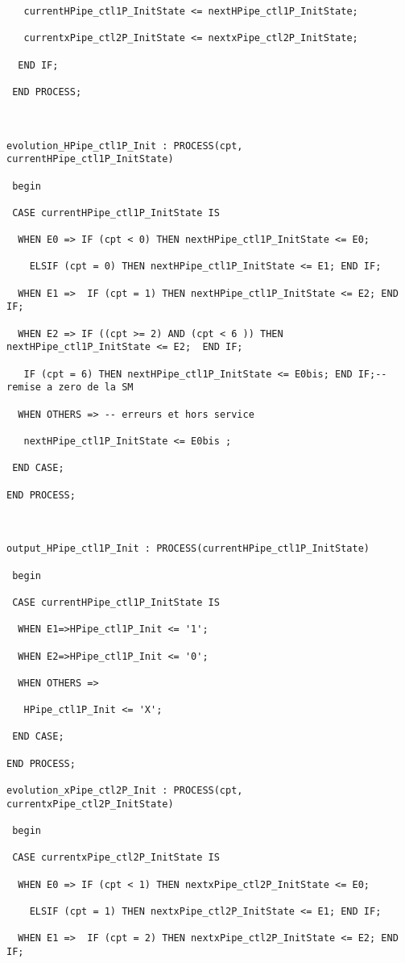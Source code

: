 \begin{verbatim}
   currentHPipe_ctl1P_InitState <= nextHPipe_ctl1P_InitState;

   currentxPipe_ctl2P_InitState <= nextxPipe_ctl2P_InitState;

  END IF;

 END PROCESS;



evolution_HPipe_ctl1P_Init : PROCESS(cpt, currentHPipe_ctl1P_InitState)

 begin 

 CASE currentHPipe_ctl1P_InitState IS

  WHEN E0 => IF (cpt < 0) THEN nextHPipe_ctl1P_InitState <= E0;

    ELSIF (cpt = 0) THEN nextHPipe_ctl1P_InitState <= E1; END IF;

  WHEN E1 =>  IF (cpt = 1) THEN nextHPipe_ctl1P_InitState <= E2; END IF;

  WHEN E2 => IF ((cpt >= 2) AND (cpt < 6 )) THEN nextHPipe_ctl1P_InitState <= E2;  END IF;

   IF (cpt = 6) THEN nextHPipe_ctl1P_InitState <= E0bis; END IF;-- remise a zero de la SM

  WHEN OTHERS => -- erreurs et hors service

   nextHPipe_ctl1P_InitState <= E0bis ;

 END CASE;

END PROCESS;



output_HPipe_ctl1P_Init : PROCESS(currentHPipe_ctl1P_InitState)

 begin

 CASE currentHPipe_ctl1P_InitState IS

  WHEN E1=>HPipe_ctl1P_Init <= '1'; 

  WHEN E2=>HPipe_ctl1P_Init <= '0'; 

  WHEN OTHERS =>

   HPipe_ctl1P_Init <= 'X';

 END CASE;

END PROCESS;

evolution_xPipe_ctl2P_Init : PROCESS(cpt, currentxPipe_ctl2P_InitState)

 begin 

 CASE currentxPipe_ctl2P_InitState IS

  WHEN E0 => IF (cpt < 1) THEN nextxPipe_ctl2P_InitState <= E0;

    ELSIF (cpt = 1) THEN nextxPipe_ctl2P_InitState <= E1; END IF;

  WHEN E1 =>  IF (cpt = 2) THEN nextxPipe_ctl2P_InitState <= E2; END IF;


\end{verbatim}
